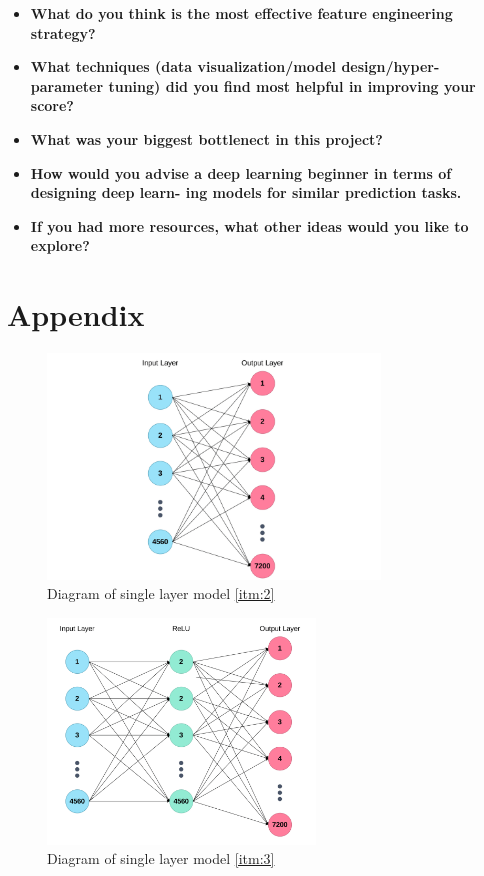 \documentclass{article}
\begin{document}
      \begin{itemize}
        \item \textbf{What do you think is the most effective feature engineering strategy?}
        \item \textbf{What techniques (data visualization/model design/hyper-parameter tuning) did
        you find most helpful in improving your score?}
        \item \textbf{What was your biggest bottlenect in this project?}
        \item \textbf{How would you advise a deep learning beginner in terms of designing deep learn-
        ing models for similar prediction tasks.}
        \item \textbf{If you had more resources, what other ideas would you like to explore?}
      \end{itemize}      

  \appendix

   \section{Appendix}
      \label{sec:appendix}

      \begin{figure}[H]
        \centering
        \includegraphics[height=6cm]{figures/single-layer-net.png}%
        \caption{Diagram of single layer model \ref{itm:2}}%
        \label{fig:3}
      \end{figure}

      \begin{figure}[H]
        \centering
        \includegraphics[height=6cm]{figures/multi-layer-net1.png}%
        \caption{Diagram of single layer model \ref{itm:3}}%
        \label{fig:4}
      \end{figure}
\end{document}
